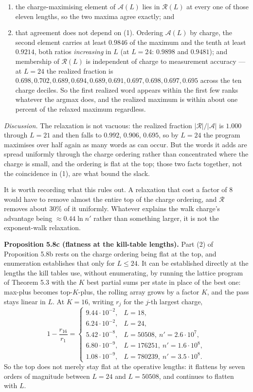 \documentclass[12pt]{article}
\providecommand{\tightlist}{\setlength{\itemsep}{0pt}\setlength{\parskip}{0pt}}
\begin{document}
\begin{enumerate}
\def\labelenumi{\arabic{enumi}.}
\tightlist
\item
  the charge-maximising element of \(\mathcal A(L)\) lies in
  \(\mathcal R(L)\) at every one of those eleven lengths, so the two
  maxima agree exactly; and
\item
  that agreement does not depend on (1). Ordering \(\mathcal A(L)\) by
  charge, the second element carries at least \(0.9846\) of the maximum
  and the tenth at least \(0.9214\), both ratios \emph{increasing} in
  \(L\) (at \(L=24\): \(0.9898\) and \(0.9481\)); and membership of
  \(\mathcal R(L)\) is independent of charge to measurement accuracy ---
  at \(L=24\) the realized fraction is \(0.698,0.702,0.689,0.694,
  0.689,0.691,0.697,0.698,0.697,0.695\) across the ten charge deciles.
  So the first realized word appears within the first few ranks whatever
  the argmax does, and the realized maximum is within about one percent
  of the relaxed maximum regardless.
\end{enumerate}

\emph{Discussion.} The relaxation is not vacuous: the realized fraction
\(\lvert\mathcal R\rvert/\lvert\mathcal A\rvert\) is \(1.000\) through
\(L=21\) and then falls to \(0.992\), \(0.906\), \(0.695\), so by
\(L=24\) the program maximises over half again as many words as can
occur. But the words it adds are spread uniformly through the charge
ordering rather than concentrated where the charge is small, and the
ordering is flat at the top; those two facts together, not the
coincidence in (1), are what bound the slack.

It is worth recording what this rules out. A relaxation that cost a
factor of \(8\) would have to remove almost the entire top of the charge
ordering, and \(\mathcal R\) removes about \(30\%\) of it uniformly.
Whatever explains the walk charge's advantage being
\(\approx0.44\ln n'\) rather than something larger, it is not the
exponent-walk relaxation.

\textbf{Proposition 5.8c (flatness at the kill-table lengths).} Part (2)
of Proposition 5.8b rests on the charge ordering being flat at the top,
and enumeration establishes that only for \(L\le24\). It can be
established directly at the lengths the kill tables use, without
enumerating, by running the lattice program of Theorem 5.3 with the
\(K\) best partial sums per state in place of the best one: max-plus
becomes top-\(K\)-plus, the rolling array grows by a factor \(K\), and
the pass stays linear in \(L\). At \(K=16\), writing \(r_j\) for the
\(j\)-th largest charge, \[
1-\frac{r_{16}}{r_1}=
\begin{cases}
9.44\cdot10^{-2}, & L=18,\\
6.24\cdot10^{-2}, & L=24,\\
5.42\cdot10^{-8}, & L=50508,\ n'=2.6\cdot10^{7},\\
6.80\cdot10^{-9}, & L=176251,\ n'=1.6\cdot10^{8},\\
1.08\cdot10^{-9}, & L=780239,\ n'=3.5\cdot10^{8}.
\end{cases}
\] So the top does not merely stay flat at the operative lengths: it
flattens by seven orders of magnitude between \(L=24\) and \(L=50508\),
and continues to flatten with \(L\).
\end{document}
